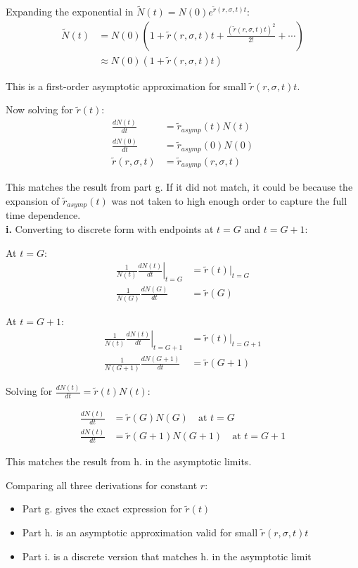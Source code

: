 \documentclass{article}
\begin{document}
Expanding the exponential in $\tilde{N}(t) = N(0)e^{\tilde{r}(r,\sigma,t)t}$:
\begin{align*}
\tilde{N}(t) &= N(0)\left(1 + \tilde{r}(r,\sigma,t)t + \frac{(\tilde{r}(r,\sigma,t)t)^2}{2!} + \cdots\right) \\
             &\approx N(0)(1 + \tilde{r}(r,\sigma,t)t)
\end{align*}

This is a first-order asymptotic approximation for small $\tilde{r}(r,\sigma,t)t$.

Now solving for $\tilde{r}(t)$:
\begin{align*}
\frac{dN(t)}{dt} &= \tilde{r}_{asymp}(t)N(t) \\
\frac{dN(0)}{dt} &= \tilde{r}_{asymp}(0)N(0) \\
\tilde{r}(r,\sigma,t) &= \tilde{r}_{asymp}(r,\sigma,t)
\end{align*}

This matches the result from part g. If it did not match, it could be because the expansion of $\tilde{r}_{asymp}(t)$ was not taken to high enough order to capture the full time dependence.\\

\textbf{i.} Converting to discrete form with endpoints at $t=G$ and $t=G+1$:

At $t=G$:
\begin{align*}
\left.\frac{1}{N(t)}\frac{dN(t)}{dt}\right|_{t=G} &= \tilde{r}(t)|_{t=G} \\
\frac{1}{N(G)}\frac{dN(G)}{dt} &= \tilde{r}(G)
\end{align*}

At $t=G+1$:
\begin{align*}
\left.\frac{1}{N(t)}\frac{dN(t)}{dt}\right|_{t=G+1} &= \tilde{r}(t)|_{t=G+1} \\
\frac{1}{N(G+1)}\frac{dN(G+1)}{dt} &= \tilde{r}(G+1)
\end{align*}

Solving for $\frac{dN(t)}{dt} = \tilde{r}(t)N(t)$:

\begin{align*}
\frac{dN(t)}{dt} &= \tilde{r}(G)N(G) \quad \text{at } t=G \\
\frac{dN(t)}{dt} &= \tilde{r}(G+1)N(G+1) \quad \text{at } t=G+1
\end{align*}

This matches the result from h. in the asymptotic limits.

Comparing all three derivations for constant $r$:
\begin{itemize}
    \item Part g. gives the exact expression for $\tilde{r}(t)$
    \item Part h. is an asymptotic approximation valid for small $\tilde{r}(r,\sigma,t)t$
    \item Part i. is a discrete version that matches h. in the asymptotic limit
\end{itemize}
\end{document}
